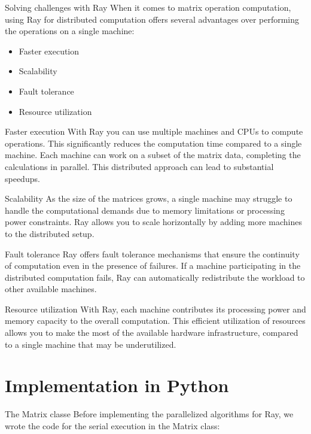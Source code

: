 \documentclass{beamer}
\begin{document}
\begin{frame}{Solving challenges with Ray}
    When it comes to matrix operation computation, using Ray for distributed computation offers several advantages over performing the operations on a single machine:
    \begin{itemize}
        \item Faster execution
        \item Scalability
        \item Fault tolerance
        \item Resource utilization
    \end{itemize}
\end{frame}

\begin{frame}{Faster execution}
    With Ray you can use multiple machines and CPUs to compute operations. This significantly reduces the computation time compared to a single machine. Each machine can work on a subset of the matrix data, completing the calculations in parallel. This distributed approach can lead to substantial speedups.
\end{frame}

\begin{frame}{Scalability}
    As the size of the matrices grows, a single machine may struggle to handle the computational demands due to memory limitations or processing power constraints. Ray allows you to scale horizontally by adding more machines to the distributed setup.
\end{frame}

\begin{frame}{Fault tolerance}
    Ray offers fault tolerance mechanisms that ensure the continuity of computation even in the presence of failures. If a machine participating in the distributed computation fails, Ray can automatically redistribute the workload to other available machines.
\end{frame}

\begin{frame}{Resource utilization}
    With Ray, each machine contributes its processing power and memory capacity to the overall computation. This efficient utilization of resources allows you to make the most of the available hardware infrastructure, compared to a single machine that may be underutilized.
\end{frame}

\section{Implementation in Python}
\begin{frame}{The Matrix classe}
    Before implementing the parallelized algorithms for Ray, we wrote the code for the serial execution in the \alert{Matrix} class:
\end{frame}
\end{document}
